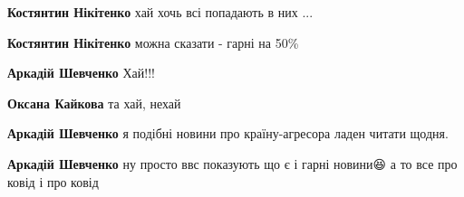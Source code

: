 \begin{itemize}
\begin{itemize}
\begin{itemize}
 
\textbf{Костянтин Нікітенко} хай хочь всі попадають в них ...

 
\textbf{Костянтин Нікітенко} можна сказати - гарні на 50\%

 
\textbf{Аркадій Шевченко} Хай!!!

 
\textbf{Оксана Кайкова} та хай, нехай \Smiley[1.0][yellow]
\end{itemize}

 
\textbf{Аркадій Шевченко} я подібні новини про країну-агресора ладен читати щодня.

 
\textbf{Аркадій Шевченко} ну просто ввс показують що є і гарні новини😆 а то все про ковід і про ковід

 

\end{itemize}
\end{itemize}
